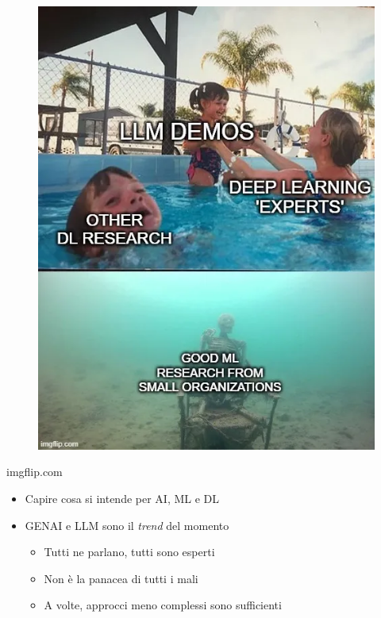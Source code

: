 \begin{frame}[t]
{\begin{minipage}[b]{\textwidth}
\begin{minipage}[b]{0.33\textwidth}
\begin{figure}[ht]
                \includegraphics[width=\textwidth]{img/meme-1.png}
            \end{figure}
            \begin{flushright}
                \vspace*{-7pt}
                {\tiny\textcopyright imgflip.com}
            \end{flushright}
        \end{minipage}
    \end{minipage}
    \begin{itemize}[leftmargin=10pt,align=right]
        \item[\alert{\faHandORight}] Capire cosa si intende per AI, ML e DL
        \item[\alert{\faHandORight}] GENAI e LLM sono il \textit{trend} del momento
        \begin{itemize}[leftmargin=10pt,align=right]
            \item[\alert{\faHandORight}] Tutti ne parlano, tutti sono esperti
            \item[\alert{\faHandORight}] \alert{Non} è la panacea di tutti i mali
            \item[\alert{\faHandORight}] A volte, approcci meno complessi sono sufficienti
        \end{itemize}
    \end{itemize}
}
\end{frame}

